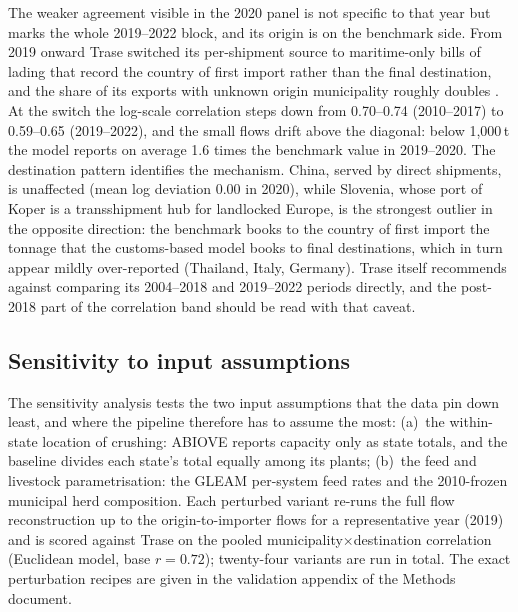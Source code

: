 \documentclass[pdflatex,sn-nature]{sn-jnl}%
\begin{document}
The weaker agreement visible in the 2020 panel is not specific to that
year but marks the whole 2019--2022 block, and its origin is on the
benchmark side. From 2019 onward Trase switched its per-shipment source
to maritime-only bills of lading that record the country of first
import rather than the final destination, and the share of its exports
with unknown origin municipality roughly doubles
\cite{trase2025soymethods}. At the switch the log-scale correlation
steps down from 0.70--0.74 (2010--2017) to 0.59--0.65 (2019--2022),
and the small flows drift above the diagonal: below 1{,}000\,t the
model reports on average 1.6 times the benchmark value in 2019--2020.
The destination pattern identifies the mechanism. China, served by
direct shipments, is unaffected (mean log deviation 0.00 in 2020),
while Slovenia, whose port of Koper is a transshipment hub for
landlocked Europe, is the strongest outlier in the opposite direction:
the benchmark books to the country of first import the tonnage that
the customs-based model books to final destinations, which in turn
appear mildly over-reported (Thailand, Italy, Germany). Trase itself
recommends against comparing its 2004--2018 and 2019--2022 periods
directly, and the post-2018 part of the correlation band should be
read with that caveat.

\subsection{Sensitivity to input assumptions}\label{subsec:val-inputs}
The sensitivity analysis tests the two input assumptions that the data pin down
least, and where the pipeline therefore has to assume the most:
(a)~the within-state location of crushing: ABIOVE reports capacity
only as state totals, and the baseline divides each state's total
equally among its plants; (b)~the feed and livestock parametrisation:
the GLEAM per-system feed rates and the 2010-frozen municipal herd
composition. Each perturbed variant re-runs the full flow
reconstruction up to the origin-to-importer flows for a representative
year (2019) and is scored against Trase on the pooled
municipality$\times$destination correlation (Euclidean model, base
$r=0.72$); twenty-four variants are run in total. The exact
perturbation recipes are given in the validation appendix of the
Methods document.
\end{document}

